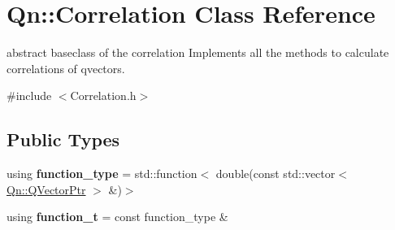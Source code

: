 \hypertarget{classQn_1_1Correlation}{}\section{Qn\+:\+:Correlation Class Reference}
\label{classQn_1_1Correlation}


abstract baseclass of the correlation Implements all the methods to calculate correlations of qvectors.  




{\ttfamily \#include $<$Correlation.\+h$>$}

\subsection*{Public Types}
\begin{DoxyCompactItemize}
\item 
\mbox{\label{classQn_1_1Correlation_ab66f963048071665e0a8f1b5de25b60f}} 
using {\bfseries function\+\_\+type} = std\+::function$<$ double(const std\+::vector$<$ \mbox{\hyperlink{classQn_1_1QVectorPtr}{Qn\+::\+Q\+Vector\+Ptr}} $>$ \&)$>$
\item 
\mbox{\label{classQn_1_1Correlation_abec540e05e2d87080622a4cf53e73d2c}} 
using {\bfseries function\+\_\+t} = const function\+\_\+type \&
\end{DoxyCompactItemize}
